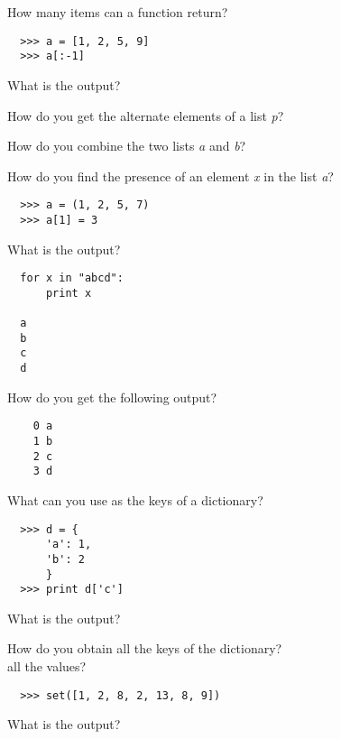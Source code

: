 \documentclass[14pt,compress]{beamer}
\begin{document}
\begin{frame}{}
  How many items can a function return?
\end{frame}

\begin{frame}[fragile]{}
  \begin{lstlisting}
  >>> a = [1, 2, 5, 9]
  >>> a[:-1]
  \end{lstlisting}
  What is the output?
\end{frame}

\begin{frame}{}
  How do you get the alternate elements of a list \emph{p}?
\end{frame}

\begin{frame}{}
  How do you combine the two lists \emph{a} and \emph{b}?
\end{frame}

\begin{frame}{}
  How do you find the presence of an element \emph{x} in the list \emph{a}?
\end{frame}

\begin{frame}[fragile]{}
  \begin{lstlisting}
  >>> a = (1, 2, 5, 7)
  >>> a[1] = 3
  \end{lstlisting}
  What is the output?
\end{frame}

\begin{frame}[fragile]{}
  \begin{lstlisting}
  for x in "abcd":
      print x

  a
  b
  c
  d
  \end{lstlisting}
  How do you get the following output? 
  \begin{lstlisting}
    0 a
    1 b
    2 c
    3 d
  \end{lstlisting}
\end{frame}

\begin{frame}{}
  What can you use as the keys of a dictionary?
\end{frame}

\begin{frame}[fragile]{}
  \begin{lstlisting}
  >>> d = {
      'a': 1,
      'b': 2
      }
  >>> print d['c']
  \end{lstlisting}
  What is the output?
\end{frame}

\begin{frame}{}
  How do you obtain all the keys of the dictionary?
  \pause
  \\all the values?
\end{frame}

\begin{frame}[fragile]{}
  \begin{lstlisting}
  >>> set([1, 2, 8, 2, 13, 8, 9])
  \end{lstlisting}
  What is the output?
\end{frame}
\end{document}
